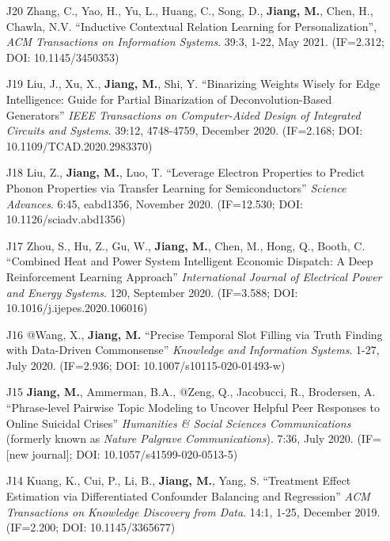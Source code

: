 \documentclass[10pt]{article}
\newenvironment{myindentpar}[1]%
{\begin{list}{}%
         {\setlength{\leftmargin}{#1}}%
         \item[]%
}
{\end{list}}
\newcounter{list}
\begin{document}
\begin{myindentpar}{0.00cm}
\begin{enumerate}[leftmargin=.5cm]
\item[J20] Zhang, C., Yao, H., Yu, L., Huang, C., Song, D., \textbf{Jiang, M.}, Chen, H., Chawla, N.V. ``Inductive Contextual Relation Learning for Personalization'', \textit{ACM Transactions on Information Systems}. 39:3, 1-22, May 2021. (IF=2.312; DOI: 10.1145/3450353)

\item[J19] Liu, J., Xu, X., \textbf{Jiang, M.}, Shi, Y. ``Binarizing Weights Wisely for Edge Intelligence: Guide for Partial Binarization of Deconvolution-Based Generators'' \textit{IEEE Transactions on Computer-Aided Design of Integrated Circuits and Systems}. 39:12, 4748-4759, December 2020. (IF=2.168; DOI: 10.1109/TCAD.2020.2983370)

\item[J18] Liu, Z., \textbf{Jiang, M.}, Luo, T. ``Leverage Electron Properties to Predict Phonon Properties via Transfer Learning for Semiconductors'' \textit{Science Advances}. 6:45, eabd1356, November 2020. (IF=12.530; DOI: 10.1126/sciadv.abd1356)
	
\item[J17] Zhou, S., Hu, Z., Gu, W., \textbf{Jiang, M.}, Chen, M., Hong, Q., Booth, C. ``Combined Heat and Power System Intelligent Economic Dispatch: A Deep Reinforcement Learning Approach'' \textit{International Journal of Electrical Power and Energy Systems}. 120, September 2020. (IF=3.588; DOI: 10.1016/j.ijepes.2020.106016)

\item[J16] @Wang, X., \textbf{Jiang, M.} ``Precise Temporal Slot Filling via Truth Finding with Data-Driven Commonsense'' \textit{Knowledge and Information Systems}. 1-27, July 2020. (IF=2.936; DOI: 10.1007/s10115-020-01493-w)

\item[J15] \textbf{Jiang, M.}, Ammerman, B.A., @Zeng, Q., Jacobucci, R., Brodersen, A. ``Phrase-level Pairwise Topic Modeling to Uncover Helpful Peer Responses to Online Suicidal Crises'' \textit{Humanities \& Social Sciences Communications} (formerly known as \textit{Nature Palgrave Communications}). 7:36, July 2020. (IF=[new journal]; DOI: 10.1057/s41599-020-0513-5)

\item[J14] Kuang, K., Cui, P., Li, B., \textbf{Jiang, M.}, Yang, S. ``Treatment Effect Estimation via Differentiated Confounder Balancing and Regression'' \textit{ACM Transactions on Knowledge Discovery from Data}. 14:1, 1-25, December 2019. (IF=2.200; DOI: 10.1145/3365677)
	

\end{enumerate}
\end{myindentpar}
\end{document}
